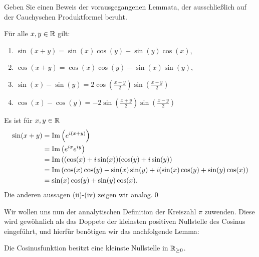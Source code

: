 \begin{task}
	Geben Sie einen Beweis der vorausgegangenen Lemmata, der ausschließlich auf der Cauchy\-schen Produktformel beruht.
\end{task}

\begin{subtheorem}[Additionstheoreme]
	Für alle $ x, y \in \mathbb{R}  $ gilt:
	\begin{enumerate}[label=(\roman*)]
		\item $ \sin (x + y) = \sin (x) \cos (y) + \sin (y) \cos (x) $,
		\item $ \cos (x + y) = \cos (x) \cos (y) - \sin (x) \sin (y) $,
		\item $ \sin (x) - \sin (y) = 2\cos \left( \frac{ x + y }{ 2 }  \right)\sin \left( \frac{ x - y }{ 2 }  \right) $
		\item $ \cos (x) - \cos (y) = -2\sin \left( \frac{ x + y }{ 2 }  \right)\sin \left( \frac{ x - y }{ 2 }  \right) $
	\end{enumerate}
\end{subtheorem}
\begin{subproof*}
	Es ist für $ x, y \in \mathbb{R}  $ 
	\begin{align*}
		\sin (x + y) &= \operatorname{Im} \left( e^{i(x + y)}  \right) \\
		~&= \operatorname{Im} \left( e^{ix} e^{iy}  \right) \\
		~&= \operatorname{Im} \left( (\cos (x) + i \sin (x) ) ( \cos (y) + i \sin (y) \right) \\
		~&= \operatorname{Im} \left( \cos (x)\cos (y) - \sin (x)\sin (y) + i (\sin (x) \cos (y) + \sin (y)\cos (x) \right) \\
		~&= \sin (x) \cos (y) + \sin (y)\cos (x).\\
	\end{align*}
	Die anderen aussagen (ii)-(iv) zeigen wir analog.\qed
\end{subproof*}
Wir wollen uns nun der annalytischen Definition der Kreiszahl $ \pi  $ zuwenden.
Diese wird gewöhnlich als das Doppete der kleinsten positiven Nullstelle des Cosinus eingeführt, und hierfür benötigen wir das nachfolgende Lemma:
\begin{sublemma}
	Die Cosinusfunktion besitzt eine kleinste Nullstelle in $ \mathbb{R}_{\geq 0}  $.
\end{sublemma}
